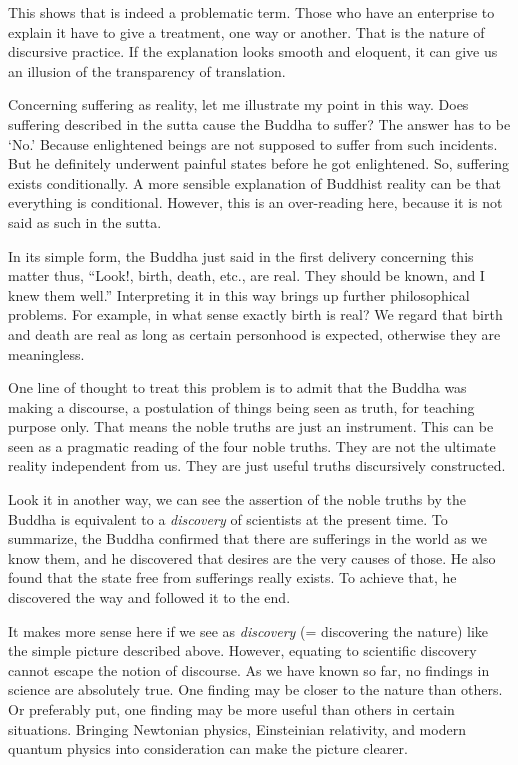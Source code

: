 This shows that  is indeed a problematic term. Those who have an enterprise to explain it have to give a treatment, one way or another. That is the nature of discursive practice. If the explanation looks smooth and eloquent, it can give us an illusion of the transparency of translation.

Concerning suffering as reality, let me illustrate my point in this way. Does suffering described in the sutta cause the Buddha to suffer? The answer has to be `No.' Because enlightened beings are not supposed to suffer from such incidents. But he definitely underwent painful states before he got enlightened. So, suffering exists conditionally. A more sensible explanation of Buddhist reality can be that everything is conditional. However, this is an over-reading here, because it is not said as such in the sutta.

In its simple form, the Buddha just said in the first delivery concerning this matter thus, ``Look!, birth, death, etc., are real. They should be known, and I knew them well.'' Interpreting it in this way brings up further philosophical problems. For example, in what sense exactly birth is real? We regard that birth and death are real as long as certain personhood is expected, otherwise they are meaningless.

One line of thought to treat this problem is to admit that the Buddha was making a discourse, a postulation of things being seen as truth, for teaching purpose only. That means the noble truths are just an instrument. This can be seen as a pragmatic reading of the four noble truths. They are not the ultimate reality independent from us. They are just useful truths discursively constructed. 

Look it in another way, we can see the assertion of the noble truths by the Buddha is equivalent to a \emph{discovery} of scientists at the present time. To summarize, the Buddha confirmed that there are sufferings in the world as we know them, and he discovered that desires are the very causes of those. He also found that the state free from sufferings really exists. To achieve that, he discovered the way and followed it to the end.

It makes more sense here if we see  as \emph{discovery} (= discovering the nature) like the simple picture described above. However, equating  to scientific discovery cannot escape the notion of discourse. As we have known so far, no findings in science are absolutely true. One finding may be closer to the nature than others. Or preferably put, one finding may be more useful than others in certain situations. Bringing Newtonian physics, Einsteinian relativity, and modern quantum physics into consideration can make the picture clearer.
